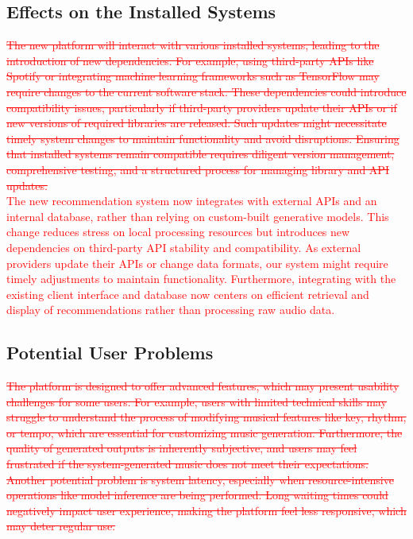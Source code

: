 \documentclass[12pt]{article}
\begin{document}
\subsection{Effects on the Installed Systems}

\textcolor{red}{\sout{The new platform will interact with various installed systems, leading to the introduction of new dependencies. For example, using third-party 
APIs like Spotify or integrating machine learning frameworks such as TensorFlow may require changes to the current software stack. These dependencies 
could introduce compatibility issues, particularly if third-party providers update their APIs or if new versions of required libraries are released. 
Such updates might necessitate timely system changes to maintain functionality and avoid disruptions. Ensuring that installed systems remain compatible 
requires diligent version management, comprehensive testing, and a structured process for managing library and API updates.}}\\

\noindent\textcolor{red}{The new recommendation system now integrates with external APIs and an internal database, rather than relying on custom-built generative models. 
This change reduces stress on local processing resources but introduces new dependencies on third-party API stability and compatibility. As external 
providers update their APIs or change data formats, our system might require timely adjustments to maintain functionality. Furthermore, integrating 
with the existing client interface and database now centers on efficient retrieval and display of recommendations rather than processing raw audio data.}


\subsection{Potential User Problems}

\textcolor{red}{\sout{The platform is designed to offer advanced features, which may present usability challenges for some users. For example, users with limited technical 
skills may struggle to understand the process of modifying musical features like key, rhythm, or tempo, which are essential for customizing music generation. 
Furthermore, the quality of generated outputs is inherently subjective, and users may feel frustrated if the system-generated music does not meet their expectations. 
Another potential problem is system latency, especially when resource-intensive operations like model inference are being performed. Long waiting times could negatively 
impact user experience, making the platform feel less responsive, which may deter regular use.}}\\
\end{document}

